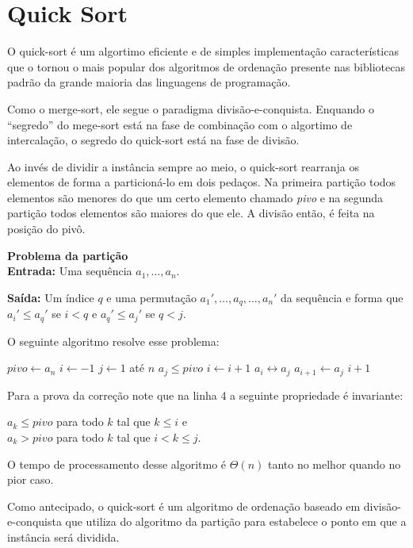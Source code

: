 \section{Quick Sort}

O quick-sort é um algortimo eficiente e de simples implementação características que o tornou o mais popular dos algoritmos de ordenação presente nas bibliotecas padrão da grande maioria das linguagens de programação.

Como o merge-sort, ele segue o paradigma divisão-e-conquista.
Enquando o ``segredo'' do mege-sort está na fase de combinação com o algortimo de intercalação, o segredo do quick-sort está na fase de divisão.

Ao invés de dividir a instância sempre ao meio, o quick-sort rearranja os elementos de forma a particioná-lo em dois pedaços.
Na primeira partição todos elementos são menores do que um certo elemento chamado {\em pivo} e na segunda partição todos elementos são maiores do que ele.
A divisão então, é feita na posição do pivô.

\vspace{1em}
{\bf Problema da partição}\\

{\bf Entrada:} Uma sequência $a_1, \dots, a_n$.

{\bf Saída:} Um índice $q$ e uma permutação $a_1', \dots, a_q, \dots, a_n'$ da sequência e forma que $a_i' \leq a_q'$ se $i < q$ e $a_q' \leq a_j'$ se $q < j$.

O seguinte algoritmo resolve esse problema:

\begin{codebox}
  \li $pivo \gets a_n$
  \li $i \gets -1$
  \li \For $j \gets 1$ até $n$
  \li \Do \If $a_j \leq pivo$ 
  \li \Then $i \gets i+1$
  \li $a_i \leftrightarrow a_j$
  \End
  \End
  \li $a_{i+1} \gets a_j$
  \li \Return $i+1$
\end{codebox}

Para a prova da correção note que na linha 4 a seguinte propriedade é invariante:

\begin{center}
  $a_k \leq pivo$ para todo $k$ tal que $k \leq i$ e \\
  $a_k > pivo$ para todo $k$ tal que $i < k \leq j$. 
\end{center}

O tempo de processamento desse algoritmo é $\Theta(n)$ tanto no melhor quando no pior caso.

Como antecipado, o quick-sort é um algoritmo de ordenação baseado em divisão-e-conquista que utiliza do algoritmo da partição para estabelece o ponto em que a instância será dividida.

